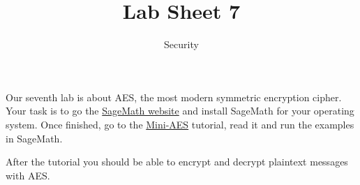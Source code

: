 \documentclass{article}
\title{Lab Sheet 7}
\date{Security}
\begin{document}
\maketitle
Our seventh lab is about AES, the most modern symmetric encryption cipher. Your task is to go the \href{https://www.sagemath.org/}{SageMath website} and install SageMath for your operating system. Once finished, go to the \href{https://doc.sagemath.org/html/en/reference/cryptography/sage/crypto/block_cipher/miniaes.html}{Mini-AES} tutorial, read it and run the examples in SageMath.

After the tutorial you should be able to encrypt and decrypt plaintext messages with AES.
\end{document}
